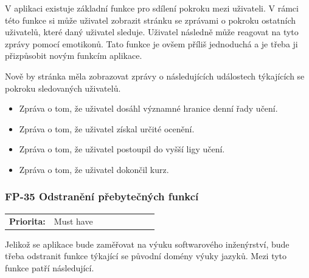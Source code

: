 V aplikaci existuje základní funkce pro sdílení pokroku mezi uživateli. V rámci této funkce si může uživatel zobrazit stránku se zprávami o pokroku ostatních uživatelů, které daný uživatel sleduje. Uživatel následně může reagovat na tyto zprávy pomocí emotikonů. Tato funkce je ovšem příliš jednoduchá a je třeba ji přizpůsobit novým funkcím aplikace.

Nově by stránka měla zobrazovat zprávy o následujících událostech týkajících se pokroku sledovaných uživatelů.

\begin{itemize}
    \item Zpráva o tom, že uživatel dosáhl významné hranice denní řady učení.
    \item Zpráva o tom, že uživatel získal určité ocenění.
    \item Zpráva o tom, že uživatel postoupil do vyšší ligy učení.
    \item Zpráva o tom, že uživatel dokončil kurz.
\end{itemize}

\subsubsection{FP-35 Odstranění přebytečných funkcí}

\begin{tabular}{lp{0.7\linewidth}}
    \textbf{Priorita:} & Must have \\
\end{tabular}

Jelikož se aplikace bude zaměřovat na výuku softwarového inženýrství, bude třeba odstranit funkce týkající se původní domény výuky jazyků. Mezi tyto funkce patří následující.

